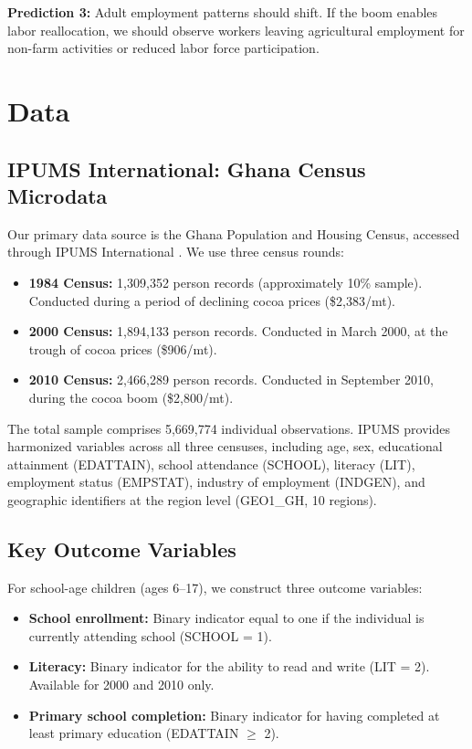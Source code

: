 \documentclass[12pt]{article}
\begin{document}
\textbf{Prediction 3:} Adult employment patterns should shift. If the boom enables labor reallocation, we should observe workers leaving agricultural employment for non-farm activities or reduced labor force participation.


\section{Data}
\label{sec:data}

\subsection{IPUMS International: Ghana Census Microdata}

Our primary data source is the Ghana Population and Housing Census, accessed through IPUMS International \citep{ipums2020}. We use three census rounds:

\begin{itemize}
\item \textbf{1984 Census:} 1,309,352 person records (approximately 10\% sample). Conducted during a period of declining cocoa prices (\$2,383/mt).
\item \textbf{2000 Census:} 1,894,133 person records. Conducted in March 2000, at the trough of cocoa prices (\$906/mt).
\item \textbf{2010 Census:} 2,466,289 person records. Conducted in September 2010, during the cocoa boom (\$2,800/mt).
\end{itemize}

The total sample comprises 5,669,774 individual observations. IPUMS provides harmonized variables across all three censuses, including age, sex, educational attainment (EDATTAIN), school attendance (SCHOOL), literacy (LIT), employment status (EMPSTAT), industry of employment (INDGEN), and geographic identifiers at the region level (GEO1\_GH, 10 regions).

\subsection{Key Outcome Variables}

For school-age children (ages 6--17), we construct three outcome variables:
\begin{itemize}
\item \textbf{School enrollment:} Binary indicator equal to one if the individual is currently attending school (SCHOOL = 1).
\item \textbf{Literacy:} Binary indicator for the ability to read and write (LIT = 2). Available for 2000 and 2010 only.
\item \textbf{Primary school completion:} Binary indicator for having completed at least primary education (EDATTAIN $\geq$ 2).
\end{itemize}
\end{document}
